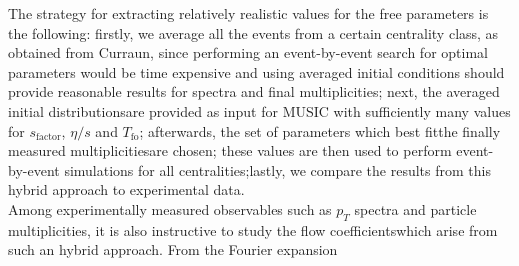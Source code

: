 The strategy for extracting relatively realistic values for the free parameters is the following: firstly, we average all the events from a certain centrality class, as obtained from {\sffamily Curraun}, since performing an event-by-event search for optimal parameters would be time expensive and using averaged initial conditions should provide reasonable results for spectra and final multiplicities; next, the averaged initial distributionsare provided as input for {\sffamily MUSIC} with sufficiently many values for $s_\text{factor}$, $\eta/s$ and $T_\text{fo}$; afterwards, the set of parameters which best fitthe finally measured multiplicitiesare chosen; these values are then used to perform event-by-event simulations for all centralities;lastly, we compare the results from this hybrid approach to experimental data. \\
Among experimentally measured observables such as $p_T$ spectra and particle multiplicities, it is also instructive to study the flow coefficientswhich arise from such an hybrid approach. From the Fourier expansion
